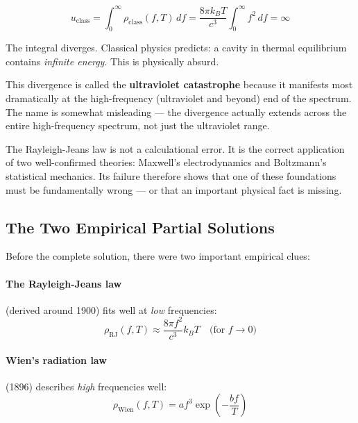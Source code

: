\begin{equation}
    u_{\text{class}} = \int_0^\infty \rho_{\text{class}}(f, T) \, df 
    = \frac{8\pi k_B T}{c^3} \int_0^\infty f^2 \, df = \infty
    \label{eq:uv_divergence}
\end{equation}

The integral diverges. Classical physics predicts: a cavity in thermal equilibrium 
contains \emph{infinite energy}. This is physically absurd.

This divergence is called the \textbf{ultraviolet catastrophe} because it manifests 
most dramatically at the high-frequency (ultraviolet and beyond) end of the spectrum. 
The name is somewhat misleading — the divergence actually extends across the entire 
high-frequency spectrum, not just the ultraviolet range.

\begin{important}
    The Rayleigh-Jeans law is not a calculational error. It is the correct application 
    of two well-confirmed theories: Maxwell's electrodynamics and Boltzmann's 
    statistical mechanics. Its failure therefore shows that one of these foundations 
    must be fundamentally wrong — or that an important physical fact is missing.
\end{important}

\subsection{The Two Empirical Partial Solutions}

Before the complete solution, there were two important empirical clues:

\paragraph{The Rayleigh-Jeans law} (derived around 1900) fits well at \emph{low} 
frequencies:
\begin{equation}
    \rho_{\text{RJ}}(f, T) \approx \frac{8\pi f^2}{c^3} k_B T \quad \text{(for } f \to 0\text{)}
\end{equation}

\paragraph{Wien's radiation law} (1896) describes \emph{high} frequencies well:
\begin{equation}
    \rho_{\text{Wien}}(f, T) = af^3 \exp\!\left(-\frac{bf}{T}\right)
    \label{eq:wien_law}
\end{equation}

